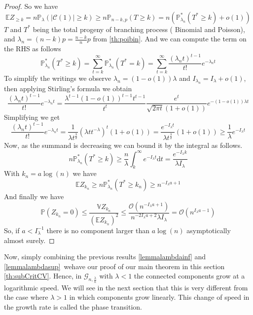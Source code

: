 \begin{proof}
	So we have
	\begin{equation}
		\mathbb{E} Z_{\geq k} = n \mathbb{P}_{\lambda}(|\mathcal{C}(1)| \geq k) \geq n \mathbb{P}_{n-k, p}(T \geq k) 
		= n(\mathbb{P}_{\lambda_n}^*(T^* \geq k) + o(1) )
	\end{equation}
	$T$ and $T^*$ being the total progeny of branching process ( Binomial and Poisson), and $\lambda_n = (n-k)p = \frac{n-k}{n}p$ from \ref{th:poibin}.
	\newline
	And we can compute the term on the RHS as follows
	\begin{equation}
		\mathbb{P}_{\lambda_n}^*(T^* \geq k)
		 = \sum_{t=k}^{\infty} \mathbb{P}_{\lambda_n}^*(T^* = k)
		 = \sum_{t=k}^{\infty} \frac{(\lambda_n t)^{t-1}}{t!} e^{-\lambda_n t}
	\end{equation}
	To simplify the writings we observe $\lambda_n = (1-o(1))\lambda$ and $I_{\lambda_n} = I_{\lambda} + o(1)$, then applying Stirling's formula we obtain
	\begin{equation}
		\frac{(\lambda_n t)^{t-1}}{t!} e^{-\lambda_n t}
		= \frac{\lambda^{t-1} (1-o(1))^{t-1}t^{t-1}}{t^t} \frac{e^t}{\sqrt{2\pi t}(1 + o(1))} e^{-(1-o(1))\lambda t}	
	\end{equation}
	Simplifying we get
	\begin{equation}
		\frac{(\lambda_n t)^{t-1}}{t!} e^{-\lambda_n t}
		= \frac{1}{\lambda t^{\frac{3}{2}}}(\lambda t t^{-\lambda})^t (1 + o(1))
		= \frac{e^{-I_{\lambda} t }}{\lambda t^{\frac{3}{2}}} (1 + o(1)) \geq \frac{1}{\lambda}e^{-I_{\lambda} t}
	\end{equation}
	Now, as the summand is decreasing we can bound it by the integral as follows.
	\begin{equation}
		n\mathbb{P}_{\lambda_n}^*(T^* \geq k)
		\geq \frac{n}{\lambda} \int_{k}^{\infty} e^{-I_{\lambda} t} \mathrm{d}t
		 = \frac{e^{-I_{\lambda} k}}{\lambda I_{\lambda}}
	\end{equation}
	With $k_n = a\log(n)$ we have 
	\begin{equation}
		\mathbb{E} Z_{k_n} \geq n\mathbb{P}_{\lambda_n}^*(T^* \geq k_n) \geq n^{-I_{\lambda} a + 1}
	\end{equation}
	And finally we have
	\begin{equation}
		\mathbb{P}(Z_{k_n} = 0) \leq \frac{\mathbb{V}Z_{k_n}}{(\mathbb{E}Z_{k_n})^2} \leq \frac{\mathcal{O}(n^{-I_{\lambda}a + 1})}{n^{-2I_{\lambda}a + 2} \lambda I_{\lambda}} 
			= \mathcal{O}(n^{I_{\lambda}a - 1})
	\end{equation}
	So, if $a<I_{\lambda}^{-1}$ there is no component larger than $a\log(n)$ asymptotically almost surely.
\end{proof}
Now, simply combining the previous results \ref{lemmalambdainf} and \ref{lemmalambdasup} wehave our proof of our main theorem in this section \ref{th:subCritCV}.
Hence, in $\mathcal{G}_{n, \frac{\lambda}{n}}$ with $\lambda < 1$ the connected components grow at a logarithmic speed. We will see in the next section that this is very different from the case where $\lambda > 1$ in which components grow linearly.
This change of speed in the growth rate is called the phase transition.

